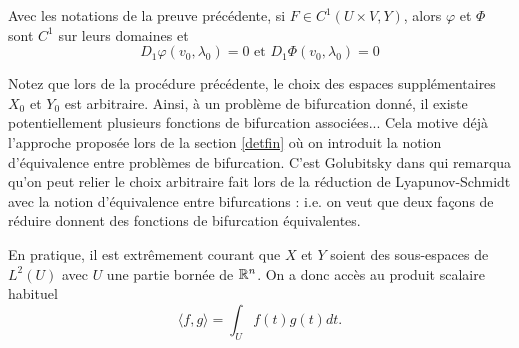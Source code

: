 \documentclass[memoire.tex]{subfiles}
\begin{document}
\begin{corollaire}\label{corr-deriv-o}
    Avec les notations de la preuve précédente, si $F\in C^1(U\times V,Y)$, alors $\varphi$ et $\Phi$ sont $C^1$ sur leurs domaines et
    \begin{equation*}
        D_1\varphi(v_0,\lambda_0)=0\text{ et }    D_1\Phi(v_0,\lambda_0)=0
    \end{equation*}
\end{corollaire}
\begin{remarque}
    Notez que lors de la procédure précédente, le choix des espaces supplémentaires $X_0$ et $Y_0$ est arbitraire. Ainsi, à un problème de bifurcation donné, il existe potentiellement plusieurs fonctions de bifurcation associées... Cela motive déjà l'approche proposée lors de la section \ref{detfin} où on introduit la notion d'équivalence entre problèmes de bifurcation. C'est Golubitsky dans 
    \cite{golubitsky1985sgb1} qui remarqua qu'on peut relier le choix arbitraire fait lors de la réduction de Lyapunov-Schmidt avec la notion d'équivalence entre bifurcations : i.e. on veut que deux façons de réduire donnent des fonctions de bifurcation équivalentes. 
\end{remarque}
En pratique, il est extrêmement courant que $X$ et $Y$ soient des sous-espaces de $L^2(U)$ avec $U$ une partie bornée de $\mathbb{R}^n$. On a donc accès au produit scalaire habituel
\begin{equation*}
    \langle f,g\rangle=\int_{U}f(t)g(t)dt.
\end{equation*}
\end{document}
